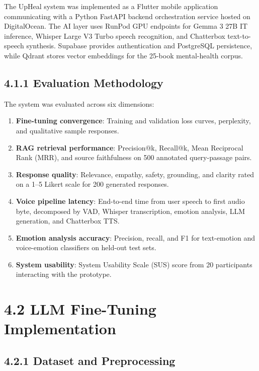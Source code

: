 \documentclass[
  letterpaper,
  12pt,
  a4paper,
  openany]{report}
\providecommand{\tightlist}{%
  \setlength{\itemsep}{0pt}\setlength{\parskip}{0pt}}
\begin{document}
The UpHeal system was implemented as a Flutter mobile application
communicating with a Python FastAPI backend orchestration service hosted
on DigitalOcean. The AI layer uses RunPod GPU endpoints for Gemma 3 27B
IT inference, Whisper Large V3 Turbo speech recognition, and Chatterbox
text-to-speech synthesis. Supabase provides authentication and
PostgreSQL persistence, while Qdrant stores vector embeddings for the
25-book mental-health corpus.

\subsection{4.1.1 Evaluation Methodology}\label{evaluation-methodology}

The system was evaluated across six dimensions:

\begin{enumerate}
\def\labelenumi{\arabic{enumi}.}
\tightlist
\item
  \textbf{Fine-tuning convergence}: Training and validation loss curves,
  perplexity, and qualitative sample responses.
\item
  \textbf{RAG retrieval performance}: Precision@k, Recall@k, Mean
  Reciprocal Rank (MRR), and source faithfulness on 500 annotated
  query-passage pairs.
\item
  \textbf{Response quality}: Relevance, empathy, safety, grounding, and
  clarity rated on a 1--5 Likert scale for 200 generated responses.
\item
  \textbf{Voice pipeline latency}: End-to-end time from user speech to
  first audio byte, decomposed by VAD, Whisper transcription, emotion
  analysis, LLM generation, and Chatterbox TTS.
\item
  \textbf{Emotion analysis accuracy}: Precision, recall, and F1 for
  text-emotion and voice-emotion classifiers on held-out test sets.
\item
  \textbf{System usability}: System Usability Scale (SUS) score from 20
  participants interacting with the prototype.
\end{enumerate}

\section{4.2 LLM Fine-Tuning
Implementation}\label{llm-fine-tuning-implementation}

\subsection{4.2.1 Dataset and
Preprocessing}\label{dataset-and-preprocessing}
\end{document}
